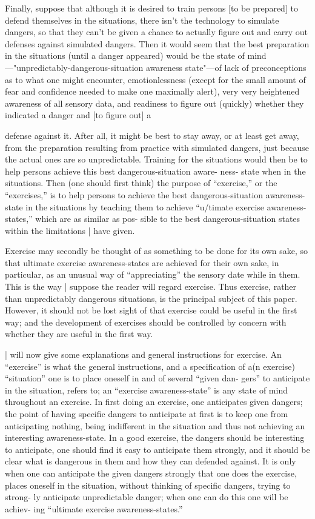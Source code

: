 Finally, suppose that although it is desired to train persons [to be prepared] 
to defend themselves in the situations, there isn’t the technology to simulate 
dangers, so that they can’t be given a chance to actually figure out and carry 
out defenses against simulated dangers. Then it would seem that the best 
preparation in the situations (until a danger appeared) would be the state 
of mind—"unpredictably-dangerous-situation awareness state"—of lack of 
preconceptions as to what one might encounter, emotionlessness (except 
for the small amount of fear and confidence needed to make one maximally 
alert), very very heightened awareness of all sensory data, and readiness 
to figure out (quickly) whether they indicated a danger and [to figure out] a 


defense against it. After all, it might be best to stay away, or at least get 
away, from the preparation resulting from practice with simulated dangers, 
just because the actual ones are so unpredictable. Training for the situations 
would then be to help persons achieve this best dangerous-situation aware- 
ness- state when in the situations. Then (one should first think) the purpose 
of “exercise,” or the “exercises,” is to help persons to achieve the best 
dangerous-situation awareness-state in the situations by teaching them to 
achieve “u/timate exercise awareness-states,” which are as similar as pos- 
sible to the best dangerous-situation states within the limitations | have 
given. 

Exercise may secondly be thought of as something to be done for its own 
sake, so that ultimate exercise awareness-states are achieved for their own 
sake, in particular, as an unusual way of “appreciating” the sensory date 
while in them. This is the way | suppose the reader will regard exercise. Thus 
exercise, rather than unpredictably dangerous situations, is the principal 
subject of this paper. However, it should not be lost sight of that exercise 
could be useful in the first way; and the development of exercises should be 
controlled by concern with whether they are useful in the first way. 

| will now give some explanations and general instructions for exercise. 
An “exercise” is what the general instructions, and a specification of a(n 
exercise) “situation” one is to place oneself in and of several “given dan- 
gers” to anticipate in the situation, refers to; an “exercise awareness-state” 
is any state of mind throughout an exercise. In first doing an exercise, one 
anticipates given dangers; the point of having specific dangers to anticipate 
at first is to keep one from anticipating nothing, being indifferent in the 
situation and thus not achieving an interesting awareness-state. In a good 
exercise, the dangers should be interesting to anticipate, one should find it 
easy to anticipate them strongly, and it should be clear what is dangerous 
in them and how they can defended against. It is only when one can 
anticipate the given dangers strongly that one does the exercise, places 
oneself in the situation, without thinking of specific dangers, trying to strong- 
ly anticipate unpredictable danger; when one can do this one will be achiev- 
ing “ultimate exercise awareness-states.” 

